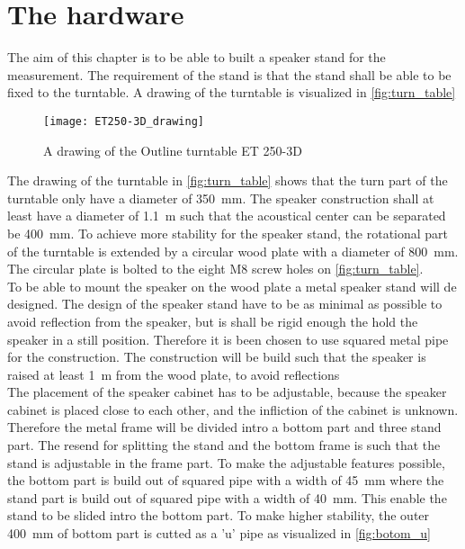 \section{The hardware}\label{sec:hardware}
The aim of this chapter is to be able to built a speaker stand for the measurement. The requirement of the stand is that the stand shall be able to be fixed to the turntable. A drawing of the turntable is visualized in \autoref{fig:turn_table}


 \begin{figure}[H]
	\centering
	\texttt{[image: ET250-3D\_drawing]}
	\caption{A drawing of the Outline turntable ET 250-3D \citep{ET250-3D}}
		\label{fig:turn_table}
\end{figure}



The drawing of the turntable in \autoref{fig:turn_table} shows that the turn part of the turntable only have a diameter of \SI{350}{\milli\meter}. The speaker construction shall at least have a diameter of \SI{1.1}{\meter} such that the acoustical center can be separated be \SI{400}{\milli\meter}. To achieve more stability for the speaker stand, the rotational part of the turntable is extended by a circular wood plate with a diameter of \SI{800}{\milli\meter}. The circular plate is bolted to the eight M8 screw holes on  \autoref{fig:turn_table}. \\
To be able to mount the speaker on the wood plate a metal speaker stand will de designed. The design of the speaker stand have to be as minimal as possible to avoid reflection from the speaker, but is shall be rigid enough the hold the speaker in a still position. Therefore it is been chosen to use squared metal pipe for the construction. The construction will be build such that the speaker is raised at least \SI{1}{\meter} from the wood plate, to avoid reflections\\
The placement of the speaker cabinet has to be adjustable, because the speaker cabinet is placed close to each other, and the infliction of the cabinet is unknown. Therefore the metal frame will be divided intro a bottom part and three stand part. The resend for splitting the stand and the bottom frame is such that the stand is adjustable in the frame part. To make the adjustable features possible, the bottom part is build out of squared pipe with a width of \SI{45}{\milli\meter} where the stand part is build out of squared pipe with a width of \SI{40}{\milli\meter}. This enable the stand to be slided intro the bottom part. To make higher stability, the outer \SI{400}{\milli\meter} of bottom part is cutted as a 'u' pipe as visualized in \autoref{fig:botom_u}

